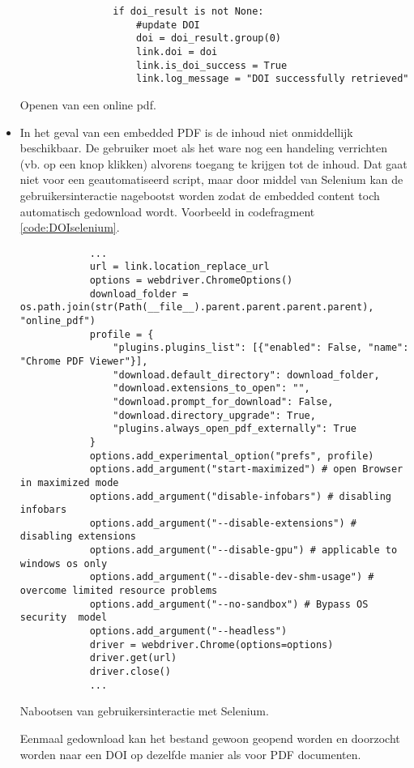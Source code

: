 \begin{itemize}
\begin{listing}
\begin{verbatim}
                if doi_result is not None:
                    #update DOI
                    doi = doi_result.group(0)
                    link.doi = doi
                    link.is_doi_success = True
                    link.log_message = "DOI successfully retrieved"
        \end{verbatim}
        \caption[Pymupdf]{Openen van een online pdf.}
        \label{code:DOIpymupdf}
    \end{listing}
    \item In het geval van een embedded PDF is de inhoud niet onmiddellijk beschikbaar. De gebruiker moet als het ware nog een handeling verrichten (vb. op een knop klikken) alvorens toegang te krijgen tot de inhoud. Dat gaat niet voor een geautomatiseerd script, maar door middel van Selenium \autocite{Selenium2025} kan de gebruikersinteractie nagebootst worden zodat de embedded content toch automatisch gedownload wordt. Voorbeeld in codefragment \ref{code:DOIselenium}.
    \begin{listing}
        \begin{verbatim}
            ...
            url = link.location_replace_url
            options = webdriver.ChromeOptions()
            download_folder = os.path.join(str(Path(__file__).parent.parent.parent.parent), "online_pdf")
            profile = {
                "plugins.plugins_list": [{"enabled": False, "name": "Chrome PDF Viewer"}],
                "download.default_directory": download_folder,
                "download.extensions_to_open": "",
                "download.prompt_for_download": False,
                "download.directory_upgrade": True,
                "plugins.always_open_pdf_externally": True
            }
            options.add_experimental_option("prefs", profile)
            options.add_argument("start-maximized") # open Browser in maximized mode
            options.add_argument("disable-infobars") # disabling infobars
            options.add_argument("--disable-extensions") # disabling extensions
            options.add_argument("--disable-gpu") # applicable to windows os only
            options.add_argument("--disable-dev-shm-usage") # overcome limited resource problems
            options.add_argument("--no-sandbox") # Bypass OS security  model
            options.add_argument("--headless")
            driver = webdriver.Chrome(options=options)
            driver.get(url)
            driver.close()
            ...
        \end{verbatim}
        \caption[Selenium]{Nabootsen van gebruikersinteractie met Selenium.}
        \label{code:DOIselenium}
    \end{listing} Eenmaal gedownload kan het bestand gewoon geopend worden en doorzocht worden naar een DOI op dezelfde manier als voor PDF documenten.
\end{itemize}
